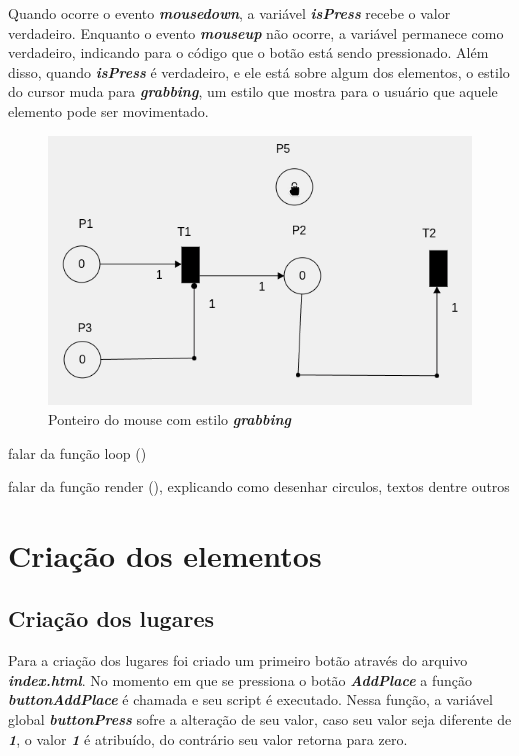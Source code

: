 \documentclass[
	12pt,				%
	openright,			%
	oneside,			%
	a4paper,			%
	english,			%
	brazil				%
	]{abntex2}
\begin{document}


Quando ocorre o evento \textbf{\textit{mousedown}}, a variável \textbf{\textit{isPress}} recebe o valor verdadeiro. Enquanto o evento \textbf{\textit{mouseup}} não ocorre, a variável permanece como verdadeiro, indicando para o código que o botão está sendo pressionado. Além disso, quando \textbf{\textit{isPress}} é verdadeiro, e ele está sobre algum dos elementos, o estilo do cursor muda para \textbf{\textit{grabbing}}, um estilo que mostra para o usuário que aquele elemento pode ser movimentado. 

\begin{figure}[ht] 
	\centering
	\includegraphics[scale=0.4]{figuras/mouse_estilo_grabbing.png}
	\caption[Mouse estilo grabbing]{Ponteiro do mouse com estilo \textbf{\textit{grabbing}}}
	\label{fig:mouse_estilo_grabbing}
\end{figure}

falar da função loop () 

falar da função render (), explicando como desenhar circulos, textos dentre outros

\section{Criação dos elementos}


\subsection*{Criação dos lugares}

Para a criação dos lugares foi criado um primeiro botão através do arquivo \textit{\textbf{index.html}}. No momento em que se pressiona o botão \textit{\textbf{AddPlace}} a função \textit{\textbf{buttonAddPlace}} é chamada e seu script é executado. Nessa função, a variável global \textit{\textbf{buttonPress}} sofre a alteração de seu valor, caso seu valor seja diferente de \textit{\textbf{1}}, o valor \textit{\textbf{1}} é atribuído, do contrário seu valor retorna para zero.
\end{document}
